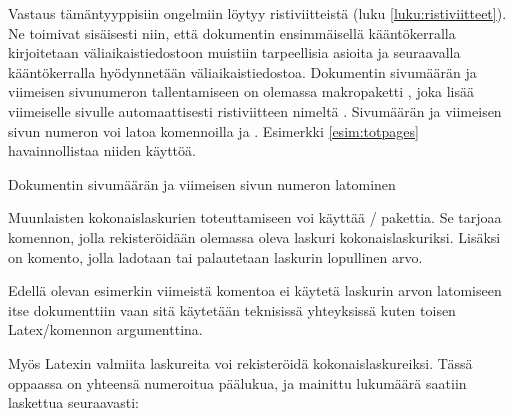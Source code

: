 Vastaus tämäntyyppisiin ongelmiin löytyy ristiviitteistä (luku
\ref{luku:ristiviitteet}). Ne toimivat sisäisesti niin, että dokumentin
ensimmäisellä kääntökerralla kirjoitetaan väliaikaistiedostoon muistiin
tarpeellisia asioita ja seuraavalla kääntökerralla hyödynnetään
väliaikaistiedostoa. Dokumentin sivumäärän ja viimeisen sivunumeron
tallentamiseen on olemassa makropaketti
, joka lisää viimeiselle sivulle
automaattisesti ristiviitteen nimeltä . Sivumäärän ja
viimeisen sivun numeron voi latoa komennoilla  ja
. Esimerkki \ref{esim:totpages} havainnollistaa niiden
käyttöä.

\begin{esimerkki*}

  \caption{Dokumentin sivumäärän ja viimeisen sivun numeron latominen}
  \label{esim:totpages}
\end{esimerkki*}

Muunlaisten kokonaislaskurien toteuttamiseen voi käyttää
\-/ pakettia. Se tarjoaa komennon,
jolla rekisteröidään olemassa oleva laskuri kokonaislaskuriksi. Lisäksi
on komento, jolla ladotaan tai palautetaan laskurin lopullinen arvo.

\begin{koodilohkosis}
\addtocounter{oma}{1} %
\end{koodilohkosis}

Edellä olevan esimerkin viimeistä komentoa  ei käytetä
laskurin arvon latomiseen itse dokumenttiin vaan sitä käytetään
teknisissä yhteyksissä kuten toisen Latex\-/komennon argumenttina.

Myös Latexin valmiita laskureita voi rekisteröidä kokonaislaskureiksi.
Tässä oppaassa on yhteensä  numeroitua päälukua, ja
mainittu lukumäärä saatiin laskettua seuraavasti:

\begin{koodilohkosis}
\end{koodilohkosis}
